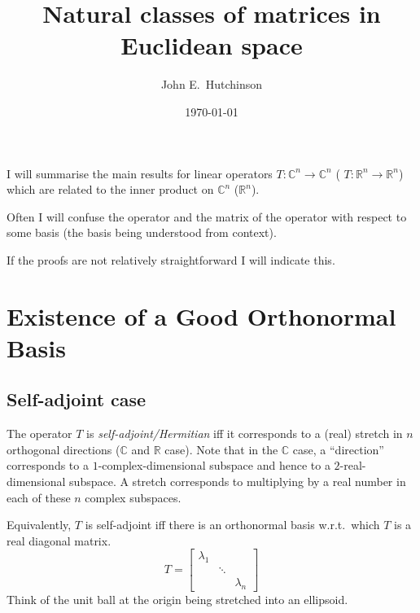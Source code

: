 \documentclass[a4paper]{amsart}
\theoremstyle{plain}
\theoremstyle{definition}
\theoremstyle{remark}
\begin{document}
\title{Natural classes of matrices in Euclidean space}  
\author{John E.\ Hutchinson}
\date{\today}

\maketitle




\tableofcontents

I will summarise the main results for linear operators $ T: \mathbb{C}^n \to \mathbb{C}^n $ 
( $ T: \mathbb{R}^n \to \mathbb{R}^n $) which are related to the inner product on $ \mathbb{C}^n$ ($ \mathbb{R}^n$). 

Often I will confuse the operator and the matrix of the operator with respect 
to some basis (the basis being understood from context). 

If the proofs are not relatively straightforward I will indicate this. 
\section{\textbf{Existence of a Good Orthonormal Basis}}

\subsection{Self-adjoint case}
The operator  $ T $  is \emph{self-adjoint/Hermitian} iff it corresponds to a (real) stretch in $ n $ 
orthogonal directions ($ \mathbb{C} $  and $ \mathbb{R} $  case). 
Note that in the $ \mathbb{C} $  case, a ``direction'' corresponds to a $ 1 $-complex-dimensional 
subspace and hence to a $ 2  $-real-dimensional subspace. A stretch corresponds to multiplying by a real number in each of these $ n $  complex subspaces. 

Equivalently, $ T $  is self-adjoint iff there is an orthonormal basis w.r.t.\ which 
$ T $  is a real diagonal matrix. 
\[
T = 
   \begin{bmatrix} %
      \lambda_1  & & \\
       & \ddots & \\
       & & \lambda_n 
   \end{bmatrix}
   \]
Think of the unit ball at the origin being stretched into an ellipsoid. 
\end{document}
